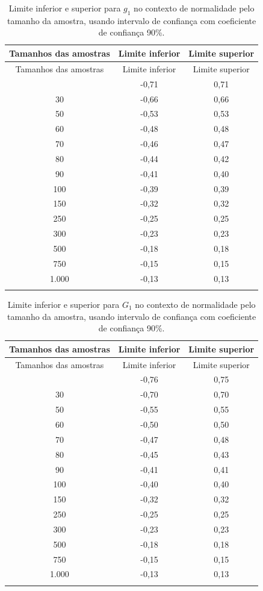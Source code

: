 \documentclass[
  10pt,
  ignorenonframetext,
]{beamer}
\begin{document}
\begin{frame}
\begin{longtable}[]{@{}ccc@{}}
\caption{Limite inferior e superior para \(g_1\) no contexto de
normalidade pelo tamanho da amostra, usando intervalo de confiança com
coeficiente de confiança 90\%.}\tabularnewline
\toprule\noalign{}
Tamanhos das amostras & Limite inferior & Limite superior \\
\midrule\noalign{}
\endfirsthead
\toprule\noalign{}
Tamanhos das amostras & Limite inferior & Limite superior \\
\midrule\noalign{}
\endhead
25 & -0,71 & 0,71 \\
30 & -0,66 & 0,66 \\
50 & -0,53 & 0,53 \\
60 & -0,48 & 0,48 \\
70 & -0,46 & 0,47 \\
80 & -0,44 & 0,42 \\
90 & -0,41 & 0,40 \\
100 & -0,39 & 0,39 \\
150 & -0,32 & 0,32 \\
250 & -0,25 & 0,25 \\
300 & -0,23 & 0,23 \\
500 & -0,18 & 0,18 \\
750 & -0,15 & 0,15 \\
1.000 & -0,13 & 0,13 \\
\bottomrule\noalign{}
\end{longtable}
\end{frame}

\begin{frame}
\begin{longtable}[]{@{}ccc@{}}
\caption{Limite inferior e superior para \(G_1\) no contexto de
normalidade pelo tamanho da amostra, usando intervalo de confiança com
coeficiente de confiança 90\%.}\tabularnewline
\toprule\noalign{}
Tamanhos das amostras & Limite inferior & Limite superior \\
\midrule\noalign{}
\endfirsthead
\toprule\noalign{}
Tamanhos das amostras & Limite inferior & Limite superior \\
\midrule\noalign{}
\endhead
25 & -0,76 & 0,75 \\
30 & -0,70 & 0,70 \\
50 & -0,55 & 0,55 \\
60 & -0,50 & 0,50 \\
70 & -0,47 & 0,48 \\
80 & -0,45 & 0,43 \\
90 & -0,41 & 0,41 \\
100 & -0,40 & 0,40 \\
150 & -0,32 & 0,32 \\
250 & -0,25 & 0,25 \\
300 & -0,23 & 0,23 \\
500 & -0,18 & 0,18 \\
750 & -0,15 & 0,15 \\
1.000 & -0,13 & 0,13 \\
\bottomrule\noalign{}
\end{longtable}
\end{frame}
\end{document}
